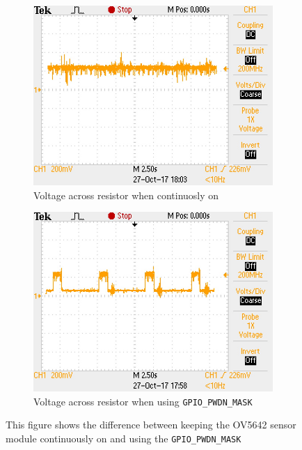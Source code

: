    \begin{figure}[ht]
    \centering
    \begin{subfigure}{\textwidth}
    \centering
        \includegraphics[width=1\linewidth]{pics/power_1.JPG}
        \caption{Voltage across  resistor when continuosly on}
    \end{subfigure}%
   
    \begin{subfigure}{\textwidth}
    \centering
        \includegraphics[width=1\linewidth]{pics/power_2.JPG}
        \caption{Voltage across  resistor when  using \texttt{GPIO\_PWDN\_MASK}}
    \end{subfigure}
       \caption{This figure shows the difference between keeping the OV5642 sensor module continuously on and using the \texttt{GPIO\_PWDN\_MASK}}
        \label{fig:power}
   \end{figure}
 
